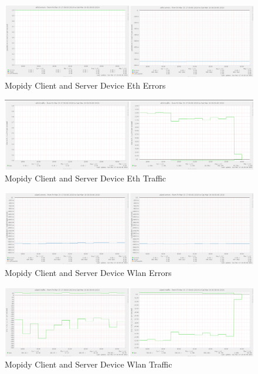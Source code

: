 \documentclass[11pt,a4paper,headinclude=false,footinclude=false]{scrreprt}
\begin{document}
\begin{figure}[H]
\includegraphics{ResultsAndAnalysis/MopidyServerTestImages/010MopidyEth0Errors.png}
\centering
\caption{Mopidy Client and Server Device Eth Errors}
\label{MopidyEthError}
\end{figure}

\begin{figure}[H]
\includegraphics{ResultsAndAnalysis/MopidyServerTestImages/011MopidyEth0Traffic.png}
\centering
\caption{Mopidy Client and Server Device Eth Traffic}
\label{MopidyEthTraffic}
\end{figure}

\begin{figure}[H]
\includegraphics{ResultsAndAnalysis/MopidyServerTestImages/022MopidyWlan0Errors.png}
\centering
\caption{Mopidy Client and Server Device Wlan Errors}
\label{MopidyWlanError}
\end{figure}

\begin{figure}[H]
\includegraphics{ResultsAndAnalysis/MopidyServerTestImages/023MopidyWlan0Traffic.png}
\centering
\caption{Mopidy Client and Server Device Wlan Traffic}
\label{MopidyWlanTraffic}
\end{figure}
\end{document}
